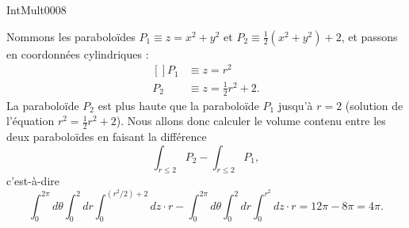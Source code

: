 
\begin{corrige}{IntMult0008}

	Nommons les paraboloïdes $P_1\equiv z=x^2+y^2$ et $P_2\equiv \frac{ 1 }{2}(x^2+y^2)+2$, et passons en coordonnées cylindriques :
	\begin{equation}
		\begin{aligned}[]
			P_1&\equiv z=r^2\\
			P_2&\equiv z=\frac{ 1 }{2}r^2+2.
		\end{aligned}
	\end{equation}
	La paraboloïde $P_2$ est plus haute que la paraboloïde $P_1$ jusqu'à $r=2$ (solution de l'équation $r^2=\frac{ 1 }{2}r^2+2$). Nous allons donc calculer le volume contenu entre les deux paraboloïdes en faisant la différence
	\begin{equation}
		\int_{r\leq 2}P_2-\int_{r\leq 2}P_1,
	\end{equation}
	c'est-à-dire
	\begin{equation}
		\int_0^{2\pi}d\theta\int_0^2dr\int_0^{(r^2/2)+2}dz\cdot r-\int_0^{2\pi}d\theta\int_0^2dr\int_0^{r^2}dz\cdot r=12\pi-8\pi=4\pi.
	\end{equation}
	
\end{corrige}
